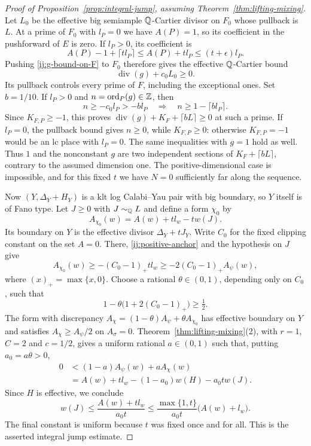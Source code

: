 \begin{proof}[Proof of Proposition~\ref{prop:integral-jump}, assuming
Theorem~\ref{thm:lifting-mixing}]
Let $L_0$ be the effective big semiample $\mathbb Q$-Cartier divisor on
$F_0$ whose pullback is $L$.  At a prime of $F_0$ with $l_P=0$
we have $A(P)=1$, so its coefficient in the pushforward of $E$
is zero.  If $l_P>0$, its coefficient is
\[
 A(P)-1+\lceil t l_P\rceil
 \le A(P)+t l_P\le(t+\epsilon)l_P.
\]
Pushing \eqref{ij:g-bound-on-F} to $F_0$ therefore gives the
effective $\mathbb Q$-Cartier bound
\[
 \operatorname{div}(g)+c_0L_0\ge0.
\]
Its pullback controls every prime of $F$, including the exceptional
ones.  Set $b=1/10$.  If $l_P>0$ and
$n=\operatorname{ord}_P(g)\in\mathbb Z$, then
\[
 n\ge-c_0l_P>-b l_P
 \quad\Longrightarrow\quad
 n\ge1-\lceil b l_P\rceil.
\]
Since $K_{F,P}\ge-1$, this proves
$\operatorname{div}(g)+K_F+\lceil bL\rceil\ge0$ at such a prime.
If $l_P=0$, the pullback bound gives $n\ge0$, while
$K_{F,P}\ge0$: otherwise $K_{F,P}=-1$ would be an lc place with
$l_P=0$.  The same inequalities with $g=1$ hold as well.
Thus $1$ and the nonconstant $g$ are two independent sections of
$K_F+\lceil bL\rceil$, contrary to the assumed dimension one.
The positive-dimensional case is impossible, and for this fixed
$t$ we have $N=0$ sufficiently far along the sequence.

Now $(Y,\Delta_Y+H_Y)$ is a klt log Calabi--Yau pair with big
boundary, so $Y$ itself is of Fano type.  Let $J\ge0$ with
$J\sim_{\mathbb Q}L$ and define a form $\chi_0$ by
\[
 A_{\chi_0}(w)=A(w)+t l_w-tw(J).
\]
Its boundary on $Y$ is the effective divisor $\Delta_Y+tJ_Y$.
Write $C_0$ for the fixed clipping constant on the set $A=0$.
There, \eqref{ij:positive-anchor} and the hypothesis on $J$ give
\[
 A_{\chi_0}(w)\ge-(C_0-1)_+t l_w
 \ge-2(C_0-1)_+A_\psi(w),
\]
where $(x)_+=\max\{x,0\}$.  Choose a rational $\theta\in(0,1)$,
depending only on $C_0$, such that
\[
 1-\theta\bigl(1+2(C_0-1)_+\bigr)\ge\tfrac12.
\]
The form with discrepancy
$A_\chi=(1-\theta)A_\psi+\theta A_{\chi_0}$ has effective
boundary on $Y$ and satisfies $A_\chi\ge A_\psi/2$ on $A_\sigma=0$.
Theorem~\ref{thm:lifting-mixing}(2), with $r=1$, $C=2$ and
$c=1/2$, gives a uniform rational $a\in(0,1)$ such that, putting
$a_0=a\theta>0$,
\begin{align*}
 0
 &<(1-a)A_\psi(w)+aA_\chi(w)\\
 &=A(w)+t l_w-(1-a_0)w(H)-a_0t w(J).
\end{align*}
Since $H$ is effective, we conclude
\[
 w(J)\le\frac{A(w)+t l_w}{a_0t}
 \le\frac{\max\{1,t\}}{a_0t}\bigl(A(w)+l_w\bigr).
\]
The final constant is uniform because $t$ was fixed once and for
all.  This is the asserted integral jump estimate.
\end{proof}
